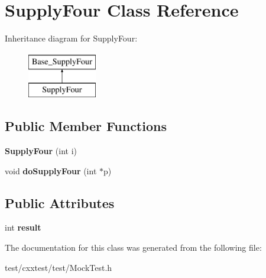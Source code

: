 \hypertarget{classSupplyFour}{\section{Supply\-Four Class Reference}
\label{classSupplyFour}
}
Inheritance diagram for Supply\-Four\-:\begin{figure}[H]
\begin{center}
\leavevmode
\includegraphics[height=2.000000cm]{classSupplyFour}
\end{center}
\end{figure}
\subsection*{Public Member Functions}
\begin{DoxyCompactItemize}
\item 
\hypertarget{classSupplyFour_adf9fe7a018d958f2e2bc02fa36ca4512}{{\bfseries Supply\-Four} (int i)}\label{classSupplyFour_adf9fe7a018d958f2e2bc02fa36ca4512}

\item 
\hypertarget{classSupplyFour_ae83571d25ff3d91e165fbc36eef446f6}{void {\bfseries do\-Supply\-Four} (int $\ast$p)}\label{classSupplyFour_ae83571d25ff3d91e165fbc36eef446f6}

\end{DoxyCompactItemize}
\subsection*{Public Attributes}
\begin{DoxyCompactItemize}
\item 
\hypertarget{classSupplyFour_ad344b8af4556df52ce3b805bdfb77e22}{int {\bfseries result}}\label{classSupplyFour_ad344b8af4556df52ce3b805bdfb77e22}

\end{DoxyCompactItemize}


The documentation for this class was generated from the following file\-:\begin{DoxyCompactItemize}
\item 
test/cxxtest/test/Mock\-Test.\-h\end{DoxyCompactItemize}
